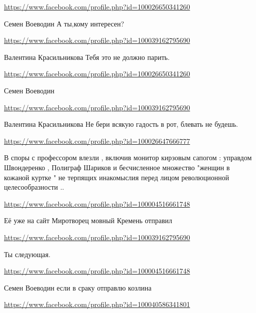 \documentclass[a4paper,11pt]{extreport}
\begin{document}
\begin{itemize}
\begin{itemize}
\url{https://www.facebook.com/profile.php?id=100026650341260}

Семен Воеводин А ты,кому интересен?

\url{https://www.facebook.com/profile.php?id=100039162795690}

Валентина Красильникова Тебя это не должно парить. 🙂

\url{https://www.facebook.com/profile.php?id=100026650341260}

Семен Воеводин 🤬🤢🤮

\url{https://www.facebook.com/profile.php?id=100039162795690}

Валентина Красильникова Не бери всякую гадость в рот, блевать не будешь. 🙂

\end{itemize}
\url{https://www.facebook.com/profile.php?id=100026647666777}

В споры с профессором влезли , включив монитор кирзовым сапогом : управдом Швондеренко , Полиграф Шариков и бесчисленное множество "женщин в кожаной куртке " не терпящих инакомыслия перед лицом революционной целесообразности ..

\url{https://www.facebook.com/profile.php?id=100004516661748}

Её уже на сайт Миротворец мовный Кремень отправил

\begin{itemize}
\url{https://www.facebook.com/profile.php?id=100039162795690}

Ты следующая.🙂

\url{https://www.facebook.com/profile.php?id=100004516661748}

Семен Воеводин если в сраку отправлю козлина

\end{itemize}
\url{https://www.facebook.com/profile.php?id=100040586341801}


\end{itemize}
\end{document}
